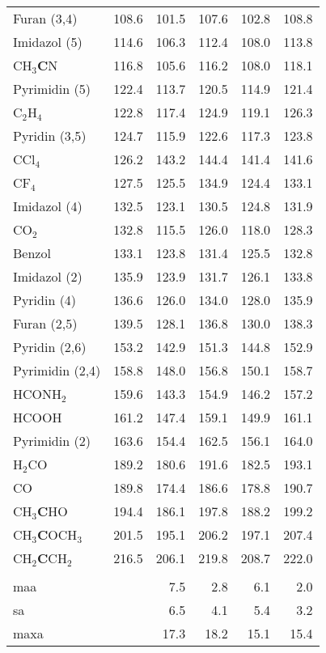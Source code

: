 \begin{table}[ht!]
{\begin{tabular}{lr|rr|rr}
    Furan (3,4) & 108.6 & 101.5 & 107.6 & 102.8 & 108.8 \\
    Imidazol (5) & 114.6 & 106.3 & 112.4 & 108.0 & 113.8 \\
    CH$_{3}$\textbf{C}N & 116.8 & 105.6 & 116.2 & 108.0 & 118.1 \\
    Pyrimidin (5) & 122.4 & 113.7 & 120.5 & 114.9 & 121.4 \\
    C$_{2}$H$_{4}$  & 122.8 & 117.4 & 124.9 & 119.1 & 126.3 \\
    Pyridin (3,5) & 124.7 & 115.9 & 122.6 & 117.3 & 123.8 \\
    CCl$_{4}$  & 126.2 & 143.2 & 144.4 & 141.4 & 141.6 \\
    CF$_{4}$   & 127.5 & 125.5 & 134.9 & 124.4 & 133.1 \\
    Imidazol (4) & 132.5 & 123.1 & 130.5 & 124.8 & 131.9 \\
    CO$_{2}$   & 132.8 & 115.5 & 126.0 & 118.0 & 128.3 \\
    Benzol & 133.1 & 123.8 & 131.4 & 125.5 & 132.8 \\
    Imidazol (2) & 135.9 & 123.9 & 131.7 & 126.1 & 133.8 \\
    Pyridin (4) & 136.6 & 126.0 & 134.0 & 128.0 & 135.9 \\
    Furan (2,5) & 139.5 & 128.1 & 136.8 & 130.0 & 138.3 \\
    Pyridin (2,6) & 153.2 & 142.9 & 151.3 & 144.8 & 152.9 \\
    Pyrimidin (2,4) & 158.8 & 148.0 & 156.8 & 150.1 & 158.7 \\
    HCONH$_{2}$ & 159.6 & 143.3 & 154.9 & 146.2 & 157.2 \\
    HCOOH & 161.2 & 147.4 & 159.1 & 149.9 & 161.1 \\
    Pyrimidin (2) & 163.6 & 154.4 & 162.5 & 156.1 & 164.0 \\
    H$_{2}$CO  & 189.2 & 180.6 & 191.6 & 182.5 & 193.1 \\
    CO    & 189.8 & 174.4 & 186.6 & 178.8 & 190.7 \\
    CH$_{3}$\textbf{C}HO & 194.4 & 186.1 & 197.8 & 188.2 & 199.2 \\
    CH$_{3}$\textbf{C}OCH$_{3}$ & 201.5 & 195.1 & 206.2 & 197.1 & 207.4 \\
    CH$_{2}$\textbf{C}CH$_{2}$ & 216.5 & 206.1 & 219.8 & 208.7 & 222.0 \\
          &       &       &       &       &  \\
    \ac{maa}   &       & 7.5   & 2.8   & 6.1   & 2.0 \\
    \ac{sa}   &       & 6.5   & 4.1   & 5.4   & 3.2 \\
    \ac{maxa}  &       & 17.3  & 18.2  & 15.1  & 15.4 \\
    \end{tabular}}%
  \label{tab:13cshifts}%
\end{table}%
